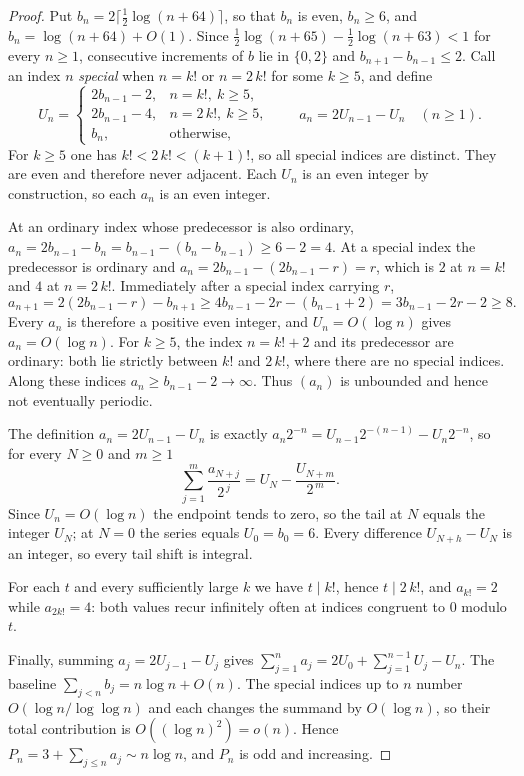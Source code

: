 \documentclass[11pt]{article}
\begin{document}
\begin{proof}
Put $b_n=2\lceil\tfrac12\log(n+64)\rceil$, so
that $b_n$ is even, $b_n\ge6$, and $b_n=\log(n+64)+O(1)$.  Since
$\tfrac12\log(n+65)-\tfrac12\log(n+63)<1$ for every $n\ge1$, consecutive
increments of $b$ lie in $\{0,2\}$ and $b_{n+1}-b_{n-1}\le2$.  Call an index
$n$ \emph{special} when $n=k!$ or $n=2\,k!$ for some $k\ge5$, and define
\[
 U_n=\begin{cases}
  2b_{n-1}-2,& n=k!,\ k\ge5,\\
  2b_{n-1}-4,& n=2\,k!,\ k\ge5,\\
  b_n,&\text{otherwise},
 \end{cases}
 \qquad a_n=2U_{n-1}-U_n\quad(n\ge1).
\]
For $k\ge5$ one has $k!<2\,k!<(k+1)!$, so all special indices are distinct.
They are even and therefore never adjacent.  Each $U_n$ is an even integer by construction, so
each $a_n$ is an even integer.

At an ordinary index whose predecessor is also ordinary,
$a_n=2b_{n-1}-b_n=b_{n-1}-(b_n-b_{n-1})\ge6-2=4$.  At a special index the
predecessor is ordinary and $a_n=2b_{n-1}-(2b_{n-1}-r)=r$, which is $2$ at
$n=k!$ and $4$ at $n=2\,k!$.  Immediately after a special index carrying $r$,
\[
 a_{n+1}=2(2b_{n-1}-r)-b_{n+1}\ge4b_{n-1}-2r-(b_{n-1}+2)
 =3b_{n-1}-2r-2\ge8 .
\]
Every $a_n$ is therefore a positive even integer, and $U_n=O(\log n)$ gives
$a_n=O(\log n)$.  For $k\ge5$, the index $n=k!+2$ and its predecessor are ordinary:
both lie strictly between $k!$ and $2\,k!$, where there are no special
indices.  Along these indices $a_n\ge b_{n-1}-2\to\infty$.
Thus $(a_n)$ is unbounded and hence not eventually periodic.

The definition $a_n=2U_{n-1}-U_n$ is exactly $a_n2^{-n}=U_{n-1}2^{-(n-1)}-U_n2^{-n}$,
so for every $N\ge0$ and $m\ge1$
\[
 \sum_{j=1}^{m}\frac{a_{N+j}}{2^{\,j}}=U_N-\frac{U_{N+m}}{2^{\,m}} .
\]
Since $U_n=O(\log n)$ the endpoint tends to zero, so the tail at $N$ equals the
integer $U_N$; at $N=0$ the series equals $U_0=b_0=6$.  Every difference
$U_{N+h}-U_N$ is an integer, so every tail shift is integral.

For each $t$ and every sufficiently large $k$ we have $t\mid k!$, hence
$t\mid2\,k!$, and $a_{k!}=2$ while $a_{2k!}=4$: both values recur infinitely
often at indices congruent to $0$ modulo $t$.

Finally, summing $a_j=2U_{j-1}-U_j$ gives
$\sum_{j=1}^{n}a_j=2U_0+\sum_{j=1}^{n-1}U_j-U_n$.  The baseline
$\sum_{j<n}b_j=n\log n+O(n)$.  The special indices up to $n$ number
$O(\log n/\log\log n)$ and each changes the summand by $O(\log n)$, so their
total contribution is $O((\log n)^2)=o(n)$.  Hence
$P_n=3+\sum_{j\le n}a_j\sim n\log n$, and $P_n$ is odd and increasing.
\end{proof}
\end{document}
